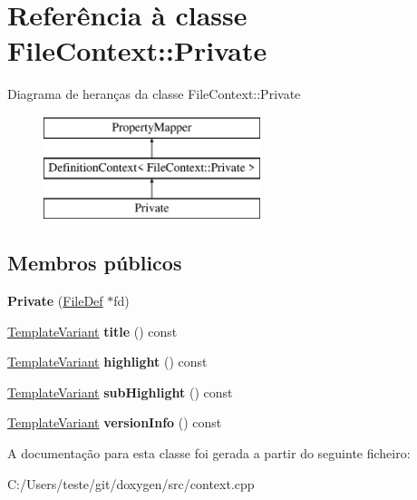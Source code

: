 \hypertarget{class_file_context_1_1_private}{\section{Referência à classe File\-Context\-:\-:Private}
\label{class_file_context_1_1_private}
}
Diagrama de heranças da classe File\-Context\-:\-:Private\begin{figure}[H]
\begin{center}
\leavevmode
\includegraphics[height=3.000000cm]{class_file_context_1_1_private}
\end{center}
\end{figure}
\subsection*{Membros públicos}
\begin{DoxyCompactItemize}
\item 
\hypertarget{class_file_context_1_1_private_adeb55edc6b9f0d3bb69c00f0095b84c0}{{\bfseries Private} (\hyperlink{class_file_def}{File\-Def} $\ast$fd)}\label{class_file_context_1_1_private_adeb55edc6b9f0d3bb69c00f0095b84c0}

\item 
\hypertarget{class_file_context_1_1_private_a5732df72750a31555da8a10f5788ef02}{\hyperlink{class_template_variant}{Template\-Variant} {\bfseries title} () const }\label{class_file_context_1_1_private_a5732df72750a31555da8a10f5788ef02}

\item 
\hypertarget{class_file_context_1_1_private_ab088f4d955499ca1d67c286a117e5bfe}{\hyperlink{class_template_variant}{Template\-Variant} {\bfseries highlight} () const }\label{class_file_context_1_1_private_ab088f4d955499ca1d67c286a117e5bfe}

\item 
\hypertarget{class_file_context_1_1_private_a07fdcdf7a4c2a31c3ca0c5ffea8b6a9e}{\hyperlink{class_template_variant}{Template\-Variant} {\bfseries sub\-Highlight} () const }\label{class_file_context_1_1_private_a07fdcdf7a4c2a31c3ca0c5ffea8b6a9e}

\item 
\hypertarget{class_file_context_1_1_private_a8a6111359b904a690260bfd74fc2d8dd}{\hyperlink{class_template_variant}{Template\-Variant} {\bfseries version\-Info} () const }\label{class_file_context_1_1_private_a8a6111359b904a690260bfd74fc2d8dd}

\end{DoxyCompactItemize}


A documentação para esta classe foi gerada a partir do seguinte ficheiro\-:\begin{DoxyCompactItemize}
\item 
C\-:/\-Users/teste/git/doxygen/src/context.\-cpp\end{DoxyCompactItemize}
